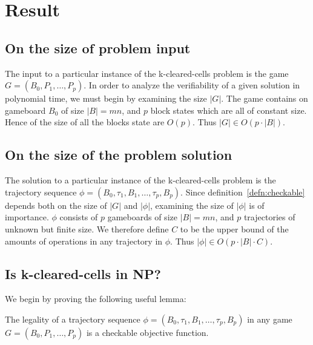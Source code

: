\section{Result}

\subsection{On the size of problem input}
The input to a particular instance of the k-cleared-cells problem is the game $G = (B_0, P_1, \ldots, P_p)$. In order to analyze the verifiability of a given solution in polynomial time, we must begin by examining the size $|G|$. The game contains on gameboard $B_0$ of size $|B| = mn$, and $p$ block states which are all of constant size. Hence of the size of all the blocks state are $O(p)$. Thus $|G| \in O(p \cdot |B|)$.

\subsection{On the size of the problem solution}
The solution to a particular instance of the k-cleared-cells problem is the trajectory sequence $\phi=(B_0, \tau_1, B_1, \ldots ,\tau_p, B_p)$. Since definition~\ref{defn:checkable} depends both on the size of $|G|$ and $|\phi|$, examining the size of $|\phi|$ is of importance. $\phi$ consists of $p$ gameboards of size $|B| = mn$, and $p$ trajectories of unknown but finite size. We therefore define $C$ to be the upper bound of the amounts of operations in any trajectory in $\phi$. Thus $|\phi| \in O(p \cdot |B| \cdot C)$.

\subsection{Is k-cleared-cells in NP?}

We begin by proving the following useful lemma:\\

\begin{lem}
\label{lem:legality}
The legality of a trajectory sequence $\phi=(B_0, \tau_1, B_1, \ldots ,\tau_p, B_p)$ in any game $G=(B_0, P_1, \ldots, P_p)$ is a checkable objective function.
\end{lem}

